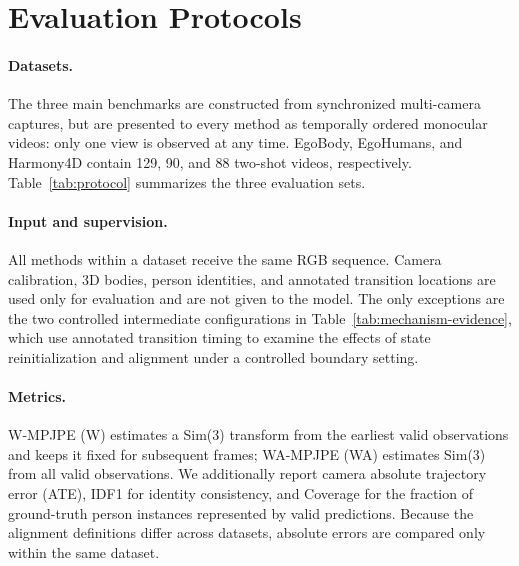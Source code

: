 \section{Evaluation Protocols}
\label{app:protocol}

\paragraph{Datasets.}
The three main benchmarks are constructed from synchronized multi-camera
captures, but are presented to every method as temporally ordered monocular
videos: only one view is observed at any time. EgoBody, EgoHumans, and
Harmony4D contain 129, 90, and 88 two-shot videos, respectively. Table~\ref{tab:protocol}
summarizes the three evaluation sets.



\paragraph{Input and supervision.}
All methods within a dataset receive the same RGB sequence. Camera
calibration, 3D bodies, person identities, and annotated transition locations
are used only for evaluation and are not given to the model. The only
exceptions are the two controlled intermediate configurations in
Table~\ref{tab:mechanism-evidence}, which use annotated transition timing to examine the effects of state
reinitialization and alignment under a controlled boundary setting.

\paragraph{Metrics.}
W-MPJPE (W) estimates a Sim(3) transform from the earliest valid observations
and keeps it fixed for subsequent frames; WA-MPJPE (WA) estimates Sim(3) from
all valid observations. We additionally report camera absolute trajectory
error (ATE), IDF1 for identity consistency, and Coverage for the fraction of
ground-truth person instances represented by valid predictions. Because the
alignment definitions differ across datasets, absolute errors are compared
only within the same dataset.

